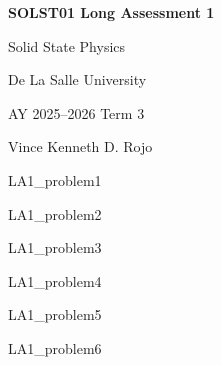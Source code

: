 \documentclass[11pt]{article}
\begin{document}
\begin{titlepage}
    \centering

    \vspace*{1.5cm}

    {\Large \textbf{SOLST01 Long Assessment 1}\par}
    \vspace{0.3cm}

    {\large Solid State Physics\par}
    \vspace{0.2cm}

    {De La Salle University\par}
    {AY 2025--2026 Term 3\par}
    \vspace{0.5cm}

    {Vince Kenneth D. Rojo\par}

    \vspace{1.5cm}

    \tableofcontents

    \vfill
\end{titlepage}

\clearpage
{LA1_problem1}

\clearpage
{LA1_problem2}

\clearpage
{LA1_problem3}

\clearpage
{LA1_problem4}

\clearpage
{LA1_problem5}

\clearpage
{LA1_problem6}

\clearpage
\printbibliography{}
\end{document}
